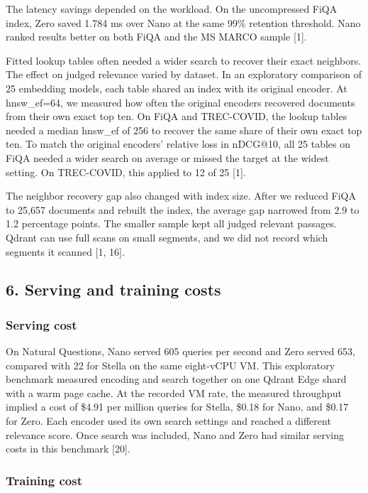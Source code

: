 \documentclass[
  english,
  10pt,
]{article}
\begin{document}
The latency savings depended on the workload. On the uncompressed FiQA
index, Zero saved 1.784 ms over Nano at the same 99\% retention
threshold. Nano ranked results better on both FiQA and the MS MARCO
sample {[}1{]}.

Fitted lookup tables often needed a wider search to recover their exact
neighbors. The effect on judged relevance varied by dataset. In an
exploratory comparison of 25 embedding models, each table shared an
index with its original encoder. At hnsw\_ef=64, we measured how often
the original encoders recovered documents from their own exact top ten.
On FiQA and TREC-COVID, the lookup tables needed a median hnsw\_ef of
256 to recover the same share of their own exact top ten. To match the
original encoders' relative loss in nDCG@10, all 25 tables on FiQA
needed a wider search on average or missed the target at the widest
setting. On TREC-COVID, this applied to 12 of 25 {[}1{]}.

The neighbor recovery gap also changed with index size. After we reduced
FiQA to 25,657 documents and rebuilt the index, the average gap narrowed
from 2.9 to 1.2 percentage points. The smaller sample kept all judged
relevant passages. Qdrant can use full scans on small segments, and we
did not record which segments it scanned {[}1, 16{]}.

\subsection{6. Serving and training
costs}\label{serving-and-training-costs}

\subsubsection{Serving cost}\label{serving-cost}

On Natural Questions, Nano served 605 queries per second and Zero served
653, compared with 22 for Stella on the same eight-vCPU VM. This
exploratory benchmark measured encoding and search together on one
Qdrant Edge shard with a warm page cache. At the recorded VM rate, the
measured throughput implied a cost of \$4.91 per million queries for
Stella, \$0.18 for Nano, and \$0.17 for Zero. Each encoder used its own
search settings and reached a different relevance score. Once search was
included, Nano and Zero had similar serving costs in this benchmark
{[}20{]}.

\subsubsection{Training cost}\label{training-cost}
\end{document}
